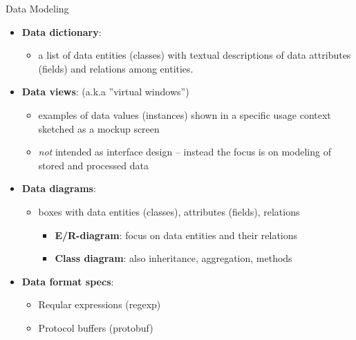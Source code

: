\begin{Slide}{Data Modeling }
\begin{itemize}
\item \textbf{Data dictionary}:  
\begin{itemize}
\item a list of data entities (classes) with textual descriptions of data attributes (fields) and relations among entities.
\end{itemize}
\item \textbf{Data views}: (a.k.a ''virtual windows'')
\begin{itemize}
\item examples of data values (instances) shown in a specific usage context sketched as a mockup screen
\item \textit{not} intended as interface design -- instead the focus is on modeling of stored and processed data 
\end{itemize}
\item \textbf{Data diagrams}: 
\begin{itemize}
\item boxes with data entities (classes), attributes (fields), relations
\begin{itemize}
\item \textbf{E/R-diagram}: focus on data entities and their relations 
\item \textbf{Class diagram}: also inheritance, aggregation, methods
\end{itemize}
\end{itemize}
\item \textbf{Data format specs}:
\begin{itemize}
\item Reqular expressions (regexp)
\item Protocol buffers (protobuf)

\end{itemize}
\end{itemize}
\end{Slide}